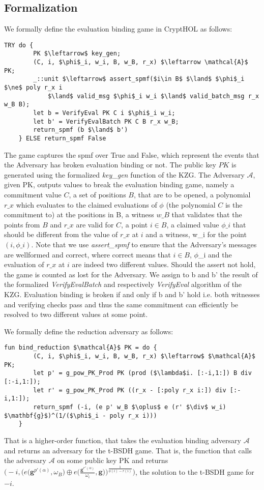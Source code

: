 \subsection*{Formalization}
We formally define the evaluation binding game in CryptHOL as follows:
\begin{lstlisting}[language=isabelle]
    TRY do {
        PK $\leftarrow$ key_gen;
        (C, i, $\phi$_i, w_i, B, w_B, r_x) $\leftarrow \mathcal{A}$ PK;
        _::unit $\leftarrow$ assert_spmf($i\in B$ $\land$ $\phi$_i $\ne$ poly r_x i 
            $\land$ valid_msg $\phi$_i w_i $\land$ valid_batch_msg r_x w_B B);
        let b = VerifyEval PK C i $\phi$_i w_i;
        let b' = VerifyEvalBatch PK C B r_x w_B;
        return_spmf (b $\land$ b')
    } ELSE return_spmf False
\end{lstlisting}
The game captures the spmf over True and False, which represent the events that the Adversary has broken evaluation binding or not.
The public key $PK$ is generated using the formalized \textit{key\_gen} function of the KZG. The Adversary $\mathcal{A}$, given PK, outputs values to break the evaluation binding game, namely a commitment value $C$, a set of positions $B$, that are to be opened, a polynomial $r\_x$ which evaluates to the claimed evaluations of $\phi$ (the polynomial $C$ is the commitment to) at the positions in B, a witness $w\_B$ that validates that the points from $B$ and $r\_x$ are valid for $C$, a point $i \in B$, a claimed value $\phi\_i$ that should be different from the value of $r\_x$ at $i$ and a witness, w\_i for the point $(i,\phi\_i)$. 
Note that we use \textit{assert\_spmf} to ensure that the Adversary's messages are wellformed and correct, where correct means that $i \in B$, $\phi$\_i and the evaluation of $r\_x$ at $i$ are indeed two different values. Should the assert not hold, the game is counted as lost for the Adversary.
We assign to b and b' the result of the formalized \textit{VerifyEvalBatch} and respectively \textit{VerifyEval} algorithm of the KZG. Evaluation binding is broken if and only if b and b' hold i.e. both witnesses and verifying checks pass and thus the same commitment can efficiently be resolved to two different values at some point.

We formally define the reduction adversary as follows:
\begin{lstlisting}[language=isabelle]
    fun bind_reduction $\mathcal{A}$ PK = do {
        (C, i, $\phi$_i, w_i, B, w_B, r_x) $\leftarrow$ $\mathcal{A}$ PK;
        let p' = g_pow_PK_Prod PK (prod ($\lambda$i. [:-i,1:]) B div [:-i,1:]);
        let r' = g_pow_PK_Prod PK ((r_x - [:poly r_x i:]) div [:-i,1:]);
        return_spmf (-i, (e p' w_B $\oplus$ e (r' $\div$ w_i) $\mathbf{g}$)^(1/($\phi$_i - poly r_x i)))
    }
\end{lstlisting}
That is a higher-order function, that takes the evaluation binding adversary $\mathcal{A}$ and returns an adversary for the t-BSDH game.
That is, the function that calls the adversary $\mathcal{A}$ on some public key PK and returns $\bigl(-i, \bigl(e\bigl(\mathbf{g}^{p'(\alpha)}, \omega_B\bigr) \oplus e\bigl(\frac{\mathbf{g}^{r'(\alpha)}}{\omega_i}, \mathbf{g}\bigr)\bigr)^{\frac{1}{\phi(i)-r(i)}}\bigr)$, the solution to the t-BSDH game for $-i$. 


